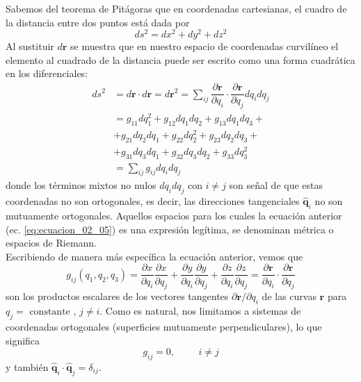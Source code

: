 Sabemos del teorema de Pitágoras que en coordenadas cartesianas, el cuadro de la distancia entre dos puntos está dada por
\[ ds^{2} = dx^{2} + dy^{2} + dz^{2} \]
Al sustituir $d\mathbf{r}$ se muestra que en nuestro espacio de coordenadas curvilíneo el elemento al cuadrado de la distancia puede ser escrito como una forma cuadrática en los diferenciales:
\begin{eqnarray}
ds^{2} &= d\mathbf{r} \cdot d \mathbf{r} =  d\mathbf{r}^{2} =  \sum_{ij} \dfrac{\partial \mathbf{r}}{\partial q_{i}} \cdot \dfrac{\partial \mathbf{r}}{\partial q_{j}} dq_{i} dq_{j} \nonumber \\
&= g_{11} dq_{1}^{2} + g_{12} dq_{1} dq_{2} + g_{13} dq_{1} dq_{3} + \nonumber \\
&+ g_{21} dq_{2}dq_{1} + g_{22} dq_{2}^{2} + g_{23} dq_{2}dq_{3} + \nonumber \\
&+ g_{31} dq_{3}dq_{1} + g_{32} dq_{3} dq_{2} + g_{33} dq_{3}^{2} \nonumber \\
&= \sum_{ij} g_{ij} dq_{i} dq_{j}
\label{eq:ecuacion_02_05}
\end{eqnarray}
donde los términos mixtos no nulos $dq_{i} dq_{j}$ con $i \neq j$ son señal de que estas coordenadas no son ortogonales, es decir, las direcciones tangenciales $\mathbf{\widehat{q}}_{i}$ no son mutuamente ortogonales. Aquellos espacios para los cuales la ecuación anterior (ec. \ref{eq:ecuacion_02_05}) es una expresión legítima, se denominan métrica o espacios de Riemann.
\\
Escribiendo de manera más específica la ecuación anterior, vemos que
\begin{equation}
g_{ij}(q_{1}, q_{2}, q_{3}) = \dfrac{\partial x}{\partial q_{i}} \dfrac{\partial x}{\partial q_{j}} + \dfrac{\partial y}{\partial q_{i}} \dfrac{\partial y}{\partial q_{j}} + \dfrac{\partial z}{\partial q_{i}} \dfrac{\partial z}{\partial q_{j}} = \dfrac{\partial \mathbf{r}}{\partial q_{i}} \cdot \dfrac{\partial \mathbf{r}}{\partial q_{j}}
\label{eq:ecuacion_02_06}
\end{equation}
son los productos escalares de los vectores tangentes $\partial \mathbf{r} / \partial q_{i}$ de las curvas $\mathbf{r}$ para $q_{j} = \mbox{ constante}$ , $j \neq i$. Como es natural, nos limitamos a  sistemas de coordenadas ortogonales (superficies mutuamente perpendiculares), lo que significa
\begin{equation}
g_{ij} = 0, \hspace{1cm} i \neq j
\label{eq:ecuacion_02_07}
\end{equation}
y también $\mathbf{\widehat{q}}_{i} \cdot \mathbf{\widehat{q}}_{j} = \delta_{ij}$.
